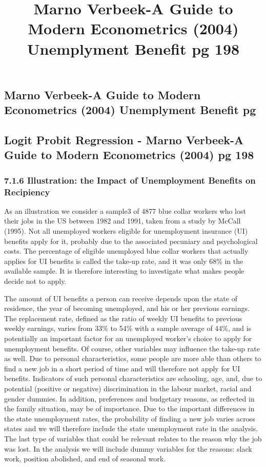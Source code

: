 \documentclass[]{article}
\title{Marno Verbeek-A Guide to Modern Econometrics (2004) Unemplyment Benefit
pg 198}
\author{}
\date{}
\begin{document}
\maketitle

\subsection{Marno Verbeek-A Guide to Modern Econometrics (2004)
Unemplyment Benefit
pg}\label{marno-verbeek-a-guide-to-modern-econometrics-2004-unemplyment-benefit-pg}

\subsection{Logit Probit Regression - Marno Verbeek-A Guide to Modern
Econometrics (2004) pg
198}\label{logit-probit-regression---marno-verbeek-a-guide-to-modern-econometrics-2004-pg-198}

\subsubsection{7.1.6 Illustration: the Impact of Unemployment Benefits
on
Recipiency}\label{illustration-the-impact-of-unemployment-benefits-on-recipiency}

As an illustration we consider a sample3 of 4877 blue collar workers who
lost their jobs in the US between 1982 and 1991, taken from a study by
McCall (1995). Not all unemployed workers eligible for unemployment
insurance (UI) benefits apply for it, probably due to the associated
pecuniary and psychological costs. The percentage of eligible unemployed
blue collar workers that actually applies for UI benefits is called the
take-up rate, and it was only 68\% in the available sample. It is
therefore interesting to investigate what makes people decide not to
apply.

The amount of UI benefits a person can receive depends upon the state of
residence, the year of becoming unemployed, and his or her previous
earnings. The replacement rate, defined as the ratio of weekly UI
benefits to previous weekly earnings, varies from 33\% to 54\% with a
sample average of 44\%, and is potentially an important factor for an
unemployed worker's choice to apply for unemployment benefits. Of
course, other variables may influence the take-up rate as well. Due to
personal characteristics, some people are more able than others to find
a new job in a short period of time and will therefore not apply for UI
benefits. Indicators of such personal characteristics are schooling,
age, and, due to potential (positive or negative) discrimination in the
labour market, racial and gender dummies. In addition, preferences and
budgetary reasons, as reflected in the family situation, may be of
importance. Due to the important differences in the state unemployment
rates, the probability of finding a new job varies across states and we
will therefore include the state unemployment rate in the analysis. The
last type of variables that could be relevant relates to the reason why
the job was lost. In the analysis we will include dummy variables for
the reasons: slack work, position abolished, and end of seasonal work.
\end{document}
